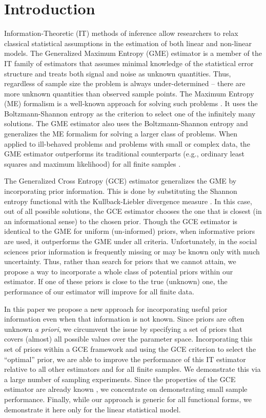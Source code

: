 \documentclass{elsarticle}
\begin{document}
\section{Introduction}
\label{sec: intro}

Information-Theoretic (IT) methods of inference allow researchers to relax classical 
statistical assumptions in the estimation of both linear and non-linear models. 
The Generalized Maximum Entropy (GME) estimator is a member of the IT family of 
estimators that assumes minimal knowledge of the statistical error structure and treats 
both signal and noise as unknown quantities. 
Thus, regardless of sample size the problem is always under-determined -- there are 
more unknown quantities than observed sample points. 
The Maximum Entropy (ME) formalism is a well-known approach for solving such 
problems \citep{jaynes1957a, jaynes1957b}. 
It uses the Boltzmann-Shannon entropy \citep{shannon1948} as the criterion to select 
one of the infinitely many solutions. 
The GME estimator also uses the Boltzmann-Shannon entropy and generalizes the ME 
formalism for solving a larger class of problems. 
When applied to ill-behaved problems and problems with small or complex data, the 
GME estimator outperforms its traditional counterparts (e.g., ordinary least squares and 
maximum likelihood) for all finite samples \citep{golan1996}. 

The Generalized Cross Entropy (GCE) estimator generalizes the GME by incorporating 
prior information. 
This is done by substituting the Shannon entropy functional with the Kullback-Liebler 
divergence measure \citep{kullback1951}. 
In this case, out of all possible solutions, the GCE estimator chooses the one that is 
closest (in an informational sense) to the chosen prior. 
Though the GCE estimator is identical to the GME for uniform (un-informed) priors, when 
informative priors are used, it outperforms the GME under all criteria. 
Unfortunately, in the social sciences prior information is frequently missing or may be 
known only with much uncertainty. 
Thus, rather than search for priors that we cannot attain, we propose a way to 
incorporate a whole class of potential priors within our estimator. 
If one of these priors is close to the true (unknown) one, the performance of our 
estimator will improve for all finite data. 

In this paper we propose a new approach for incorporating useful prior information 
even when that information is not known. 
Since priors are often unknown \emph{a priori}, we circumvent the issue by specifying a 
set of priors that covers (almost) all possible values over the parameter space. 
Incorporating this set of priors within a GCE framework and using the GCE criterion to 
select the ``optimal'' prior, we are able to improve the performance of this IT estimator 
relative to all other estimators and for all finite samples. 
We demonstrate this via a large number of sampling experiments. 
Since the properties of the GCE estimator are already known \citep{golan1996, 
mittelhammer2000}, we concentrate on demonstrating small sample performance. 
Finally, while our approach is generic for all functional forms, we demonstrate it here 
only for the linear statistical model.
\end{document}
